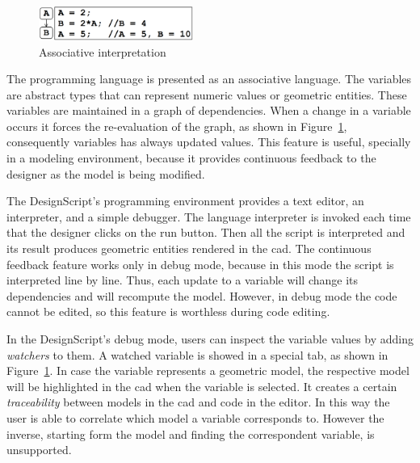 \begin{figure}
  \begin{center}
    \includegraphics[width=0.45\textwidth]{images/designscript}
  \end{center}
 \caption{Associative interpretation}  
    \label{fig:designscript}
\end{figure}

The programming language is presented as an associative language. The variables are abstract types that can represent numeric values or geometric entities. These variables are maintained in a graph of dependencies. When a change in a variable occurs it forces the re-evaluation of the graph, as shown in Figure~\ref{fig:designscript}, consequently variables has always updated values. This feature is useful, specially in a modeling environment, because it provides continuous feedback to the designer as the model is being modified.

The DesignScript's programming environment provides a text editor, an interpreter, and a simple debugger. The language interpreter is invoked each time that the designer clicks on the run button. Then all the script is interpreted and its result produces geometric entities rendered in the \gls{cad}. The continuous feedback feature works only in debug mode, because in this mode the script is interpreted line by line. Thus, each update to a variable will change its dependencies and will recompute the model. However, in debug mode the code cannot be edited, so this feature is worthless during code editing.

In the DesignScript's debug mode, users can inspect the variable values by adding \textit{watchers} to them. A watched variable is showed in a special tab, as shown in Figure~\ref{fig:designscript}. In case the variable represents a geometric model, the respective model will be highlighted in the \gls{cad} when the variable is selected. It creates a certain \textit{traceability} between models in the \gls{cad} and code in the editor. In this way the user is able to correlate which model a variable corresponds to. However the inverse, starting form the model and finding the correspondent variable, is unsupported.

